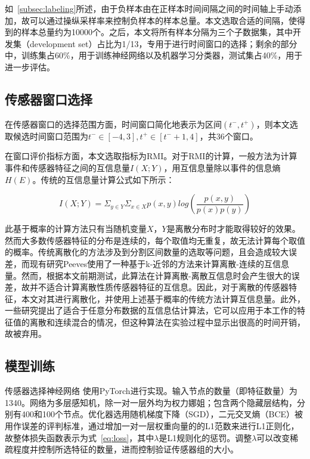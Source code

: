 如~\ref{subsec:labeling}所述，由于负样本由在正样本时间间隔之间的时间轴上手动添加，故可以通过操纵采样率来控制负样本的样本总量。本文选取合适的间隔，使得到的样本总量约为10000个。之后，本文将所有样本分隔为三个子数据集，其中开发集（development set）占比为1/13，专用于进行时间窗口的选择；剩余的部分中，训练集占60\%，用于训练神经网络以及机器学习分类器，测试集占40\%，用于进一步评估。

\subsection{传感器窗口选择}

在传感器窗口的选择范围方面，时间窗口简化地表示为区间$(t^-,t^+)$，则本文选取候选时间窗口范围为$t^-\in [-4,3],t^+\in [t^-+1,4]$，共36个窗口。

在窗口评价指标方面，本文选取指标为RMI。对于RMI的计算，一般方法为计算事件和传感器特征之间的互信息量$I(X;Y)$，用互信息量除以事件的信息熵$H(E)$。传统的互信息量计算公式如下所示：

\begin{equation}
	I(X;Y)=\Sigma_{y\in Y}\Sigma_{x\in X} p(x,y)log(\frac{p(x,y)}{p(x)p(y)})
\end{equation}

此基于概率的计算方法只有当随机变量$X$，$Y$是离散分布时才能取得较好的效果。然而大多数传感器特征的分布是连续的，每个取值均无重复，故无法计算每个取值的概率。传统离散化的方法涉及到分割区间数量的选取等问题，且会造成较大误差，而现有研究Peeves使用了一种基于k-近邻的方法来计算离散-连续的互信息量。然而，根据本文前期测试，此算法在计算离散-离散互信息时会产生很大的误差，故并不适合计算离散性质传感器特征的互信息。因此，对于离散的传感器特征，本文对其进行离散化，并使用上述基于概率的传统方法计算互信息量。此外，一些研究提出了适合于任意分布数据的互信息估计算法，它可以应用于本工作的特征值的离散和连续混合的情况，但这种算法在实验过程中显示出很高的时间开销，故被弃用。

\subsection{模型训练}

传感器选择神经网络 使用PyTorch进行实现。输入节点的数量（即特征数量）为1340。网络为多层感知机，除一对一层外均为权力娜姐；包含两个隐藏层结构，分别有400和100个节点。优化器选用随机梯度下降（SGD），二元交叉熵（BCE）被用作误差的评判标准，通过增加一对一层权重向量的的L1范数来进行L1正则化，故整体损失函数表示为式~\ref{eq:loss}，其中$\lambda$是L1规则化的惩罚。调整$\lambda$可以改变稀疏程度并控制所选特征的数量，进而控制验证传感器组的大小。

